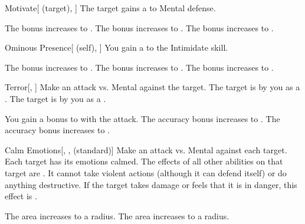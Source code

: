 \lowercase{\hypertarget{spell:Motivate}{}}\label{spell:Motivate}
\begin{attuneability}[Rank 1]{\hypertarget{spell:Motivate}{Motivate}}[ (target), ]
The target gains a   to Mental defense.

\rankline
{} The bonus increases to .
 The bonus increases to .
 The bonus increases to .
\end{attuneability}
\vspace{0.25em}



\lowercase{\hypertarget{spell:Ominous Presence}{}}\label{spell:Ominous Presence}
\begin{attuneability}[Rank 1]{\hypertarget{spell:Ominous Presence}{Ominous Presence}}[ (self), ]
You gain a   to the Intimidate skill.

\rankline
{} The bonus increases to .
 The bonus increases to .
 The bonus increases to .
\end{attuneability}
\vspace{0.25em}



\lowercase{\hypertarget{spell:Terror}{}}\label{spell:Terror}
\begin{freeability}[Rank 1]{\hypertarget{spell:Terror}{Terror}}[, ]
Make an attack vs. Mental against the target.
\hit The target is \shaken by you as a .
\crit The target is  by you as a .

\rankline
{} You gain a  bonus to  with the attack.
 The accuracy bonus increases to .
 The accuracy bonus increases to .
\end{freeability}
\vspace{0.25em}



\lowercase{\hypertarget{spell:Calm Emotions}{}}\label{spell:Calm Emotions}
\begin{freeability}[Rank 3]{\hypertarget{spell:Calm Emotions}{Calm Emotions}}[, ,  (standard)]
Make an attack vs. Mental against each target.
\hit Each target has its emotions calmed.
The effects of all other  abilities on that target are .
It cannot take violent actions (although it can defend itself) or do anything destructive.
If the target takes damage or feels that it is in danger, this effect is .

\rankline
{} The area increases to a \areahuge radius.
 The area increases to a \areaext radius.
\end{freeability}
\vspace{0.25em}




